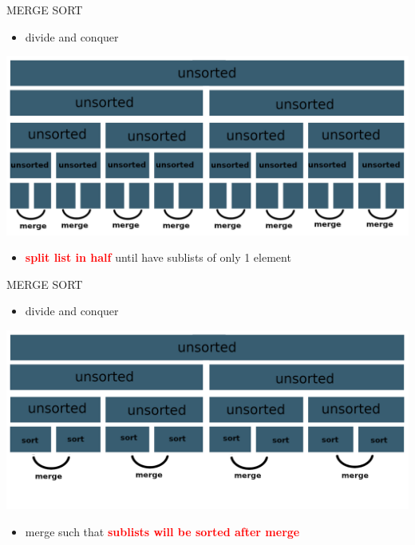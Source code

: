 \documentclass[aspectratio=169]{beamer}
\begin{document}
\begin{frame}{MERGE SORT}
\begin{itemize}
\item divide and conquer
\end{itemize}
\begin{center}
\includegraphics[scale=0.70]{graphics/marge_sort.png}
\end{center}
\begin{itemize}
\item \textcolor{red}{\textbf{split list in half}} until have sublists of only 1 element

\end{itemize}

\end{frame}

\begin{frame}{MERGE SORT}
\begin{itemize}
\item divide and conquer
\end{itemize}
\begin{center}
\includegraphics[scale=0.70]{graphics/marge_sort2.png}
\end{center}
\begin{itemize}
\item merge such that \textcolor{red}{\textbf{sublists will be sorted after merge}}
\end{itemize}
\end{frame}
\end{document}
